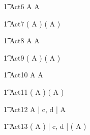 \begin{circusaction}
        \t1 Act6 \circdef  A \circendby {} \rcirctime   \intchoice A \circendby {} \rcirctime\\
\end{circusaction}

\begin{circusaction}
        \t1 Act7 \circdef ( A \circendby {} \rcirctime )  \intchoice ( A \circendby {} \rcirctime )\\
\end{circusaction}

\begin{circusaction}
        \t1 Act8 \circdef  A \circendby {} \rcirctime \interleave A \circendby {} \rcirctime \\
\end{circusaction}

\begin{circusaction}
        \t1 Act9 \circdef ( A \circendby {} \rcirctime )  \interleave ( A \circendby {} \rcirctime )\\
\end{circusaction}

\begin{circusaction}
        \t1 Act10 \circdef A \circendby {} \rcirctime  \circinterrupt A \circendby {} \rcirctime \\
\end{circusaction}

\begin{circusaction}
        \t1 Act11 \circdef ( A \circendby {} \rcirctime )  \circinterrupt ( A \circendby {} \rcirctime  )\\
\end{circusaction}


\begin{circusaction}
        \t1 Act12 \circdef A \circendby {} \rcirctime  \lpar | \lchanset c, d \rchanset | \rpar A \circendby {} \rcirctime\\
\end{circusaction}

\begin{circusaction}
        \t1 Act13 \circdef ( A \circendby {} \rcirctime )  \lpar | \lchanset c, d \rchanset | \rpar ( A \circendby {} \rcirctime)\\
\end{circusaction}

